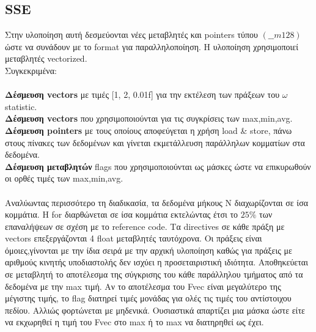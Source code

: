 \documentclass[11pt]{article}
\begin{document}
\vspace{10mm}

\subsection{ SSE}
\vspace{5mm}
Στην υλοποίηση αυτή δεσμεύονται νέες μεταβλητές και pointers τύπου  $(\_\_m128)$ ώστε να συνάδουν με το format  για παραλληλοποίηση. Η υλοποίηση χρησιμοποιεί μεταβλητές vectorized.
 \\Συγκεκριμένα:\\\\
\textbf{Δέσμευση vectors} με τιμές [1, 2, 0.01f] για την εκτέλεση των πράξεων του $\omega$ statistic.\\
\textbf{Δέσμευση vectors}  που χρησιμοποιούνται για τις συγκρίσεις των max,min,avg.\\
\textbf{Δέσμευση pointers} με τους οποίους αποφεύγεται η χρήση load \& store, πάνω στους πίνακες των δεδομένων και γίνεται εκμετάλλευση παράλληλων κομματίων στα δεδομένα. \\
\textbf{Δέσμευση μεταβλητών} flags  που χρησιμοποιούνται ως μάσκες ώστε να επικυρωθούν οι ορθές τιμές των max,min,avg.\\ \\Αναλύωντας περισσότερο τη διαδικασία, τα δεδομένα μήκους Ν διαχωρίζονται σε ίσα κομμάτια. Η  for  διαρθώνεται σε ίσα κομμάτια εκτελώντας έτσι το $25\%$ των επαναλήψεων σε σχέση με το reference code. Τα  directives  σε κάθε πράξη με vectors  επεξεργάζονται  4 float μεταβλητές ταυτόχρονα. Οι πράξεις είναι όμοιες,γίνονται με την ίδια σειρά με την αρχική υλοποίηση καθώς για πράξεις με αριθμούς κινητής υποδιαστολής δεν ισχύει η προσεταιριστική ιδιότητα. Αποθηκεύεται σε μεταβλητή το αποτέλεσμα της σύγκρισης του κάθε παράλληλου τμήματος από τα δεδομένα με την max τιμή. Αν το αποτέλεσμα του  Fvec  είναι μεγαλύτερο της μέγιστης τιμής, το  flag   διατηρεί τιμές μονάδας για ολές τις τιμές του αντίστοιχου πεδίου. Αλλιώς φορτώνεται με μηδενικά. Ουσιαστικά απαρτίζει μια μάσκα ώστε είτε να εκχωρηθεί η τιμή του Fvec  στο max ή το max  να διατηρηθεί ως έχει.
\end{document}
